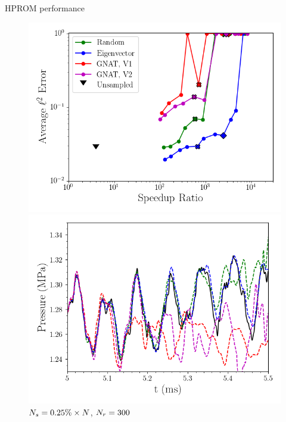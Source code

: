 \documentclass[]{beamer}
\begin{document}
\begin{frame}{HPROM performance}
	\begin{figure}
		\begin{minipage}{0.49\linewidth}
			\includegraphics[width=0.99\linewidth]{Images/experiments/cvrc/sampled_dt5e-7_Average_errorRaw_pareto.png}
			\caption*{$\dt = 5 \times \dtFOM$}
		\end{minipage}
		\begin{minipage}{0.49\linewidth}
			\includegraphics[width=0.99\linewidth]{Images/experiments/cvrc/pressure_probe_deim_dt5e-7_samp0p0025.png}
			\caption*{$N_s = 0.25\% \times N$, $N_r = 300$}
		\end{minipage}
	\end{figure}
\end{frame}
\end{document}
